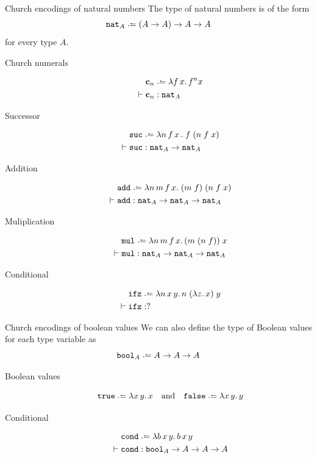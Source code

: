 \begin{frame}[allowframebreaks]{Church encodings of natural numbers}
The type of natural numbers is of the form
\[
  \nat_A \defeq (A \to A) \to A \to A
\]
for every type $A$.
  
  \begin{description}
    \item[Church numerals]
      \begin{align*}
        & \bc_n \defeq \lambda f\,x.\,
        f^n x \\
        \vdash{} & \bc_n : \nat_A
      \end{align*}
    \item[Successor]
      \begin{align*}
        & \suc \defeq \lambda n \,f\,x\,.\;f\;(n\;f\;x) \\
        \vdash{} & \suc : \nat_A \to \nat_A
      \end{align*}
    \item[Addition]
      \begin{align*}
        & \add \defeq \lambda n\,m\,f\,x.\; (m\;f)\;(n\;f\;x) \\
        \vdash{} & \add : \nat_A \to \nat_A \to \nat_A
      \end{align*}
    \item[Muliplication] 
      \begin{align*}
        & \mul \defeq \lambda n\,m\,f\,x.\, (m\;(n\;f))\;x\\
      \vdash{} & \mul : \nat_A \to \nat_A \to \nat_A
      \end{align*}
    \item[Conditional]
      \begin{align*}
        & \ifz \defeq \lambda n\,x\,y.\, n\;(\lambda z.\, x)\;y\\
        \vdash {} & \ifz : ?
      \end{align*}
  \end{description}

\end{frame}
\begin{frame}{Church encodings of boolean values}
We can also define the type of Boolean values 
for each type variable as
\[
  \bool_A \defeq A \to A \to A
\]
\begin{description}
  \item[Boolean values]
      \[
        \true \defeq \lambda x\,y.\,x 
        \quad\text{and}\quad
        \false \defeq \lambda x\,y.\,y 
      \]
  \item[Conditional]
    \begin{align*}
      & \cond \defeq \lambda b\,x\,y.\, b\,x\,y\\
      \vdash {} & \cond : \bool_{A} \to A \to A \to A
    \end{align*}
\end{description}
\end{frame}


